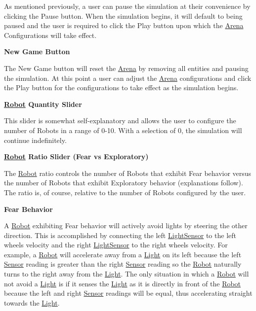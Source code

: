 As mentioned previously, a user can pause the simulation at their convenience by clicking the Pause button. When the simulation begins, it will default to being paused and the user is required to click the Play button upon which the \hyperlink{classArena}{Arena} Configurations will take effect.

{\bfseries New Game Button}

The New Game button will reset the \hyperlink{classArena}{Arena} by removing all entities and pausing the simulation. At this point a user can adjust the \hyperlink{classArena}{Arena} configurations and click the Play button for the configurations to take effect as the simulation begins.

{\bfseries \hyperlink{classRobot}{Robot} Quantity Slider}

This slider is somewhat self-\/explanatory and allows the user to configure the number of Robots in a range of 0-\/10. With a selection of 0, the simulation will continue indefinitely.

{\bfseries \hyperlink{classRobot}{Robot} Ratio Slider (Fear vs Exploratory)}

The \hyperlink{classRobot}{Robot} ratio controls the number of Robots that exhibit Fear behavior versus the number of Robots that exhibit Exploratory behavior (explanations follow). The ratio is, of course, relative to the number of Robots configured by the user.

{\bfseries Fear Behavior}

A \hyperlink{classRobot}{Robot} exhibiting Fear behavior will actively avoid lights by steering the other direction. This is accomplished by connecting the left \hyperlink{classLightSensor}{Light\+Sensor} to the left wheel\textquotesingle{}s velocity and the right \hyperlink{classLightSensor}{Light\+Sensor} to the right wheel\textquotesingle{}s velocity. For example, a \hyperlink{classRobot}{Robot} will accelerate away from a \hyperlink{classLight}{Light} on its left because the left \hyperlink{classSensor}{Sensor} reading is greater than the right \hyperlink{classSensor}{Sensor} reading so the \hyperlink{classRobot}{Robot} naturally turns to the right away from the \hyperlink{classLight}{Light}. The only situation in which a \hyperlink{classRobot}{Robot} will not avoid a \hyperlink{classLight}{Light} is if it senses the \hyperlink{classLight}{Light} as it is directly in front of the \hyperlink{classRobot}{Robot} because the left and right \hyperlink{classSensor}{Sensor} readings will be equal, thus accelerating straight towards the \hyperlink{classLight}{Light}.

